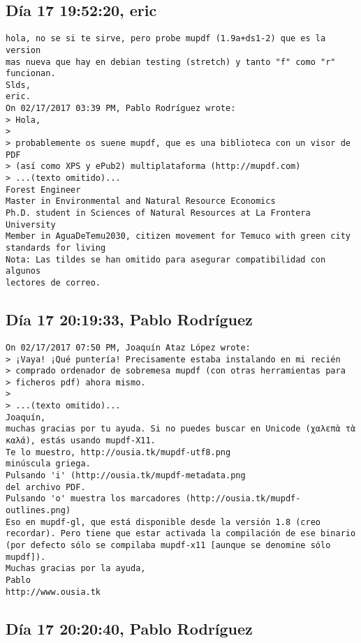 \documentclass[a4paper,10pt]{article}
\begin{document}
\subsection{Día 17 19:52:20, eric}

\begin{lstlisting}
hola, no se si te sirve, pero probe mupdf (1.9a+ds1-2) que es la version 
mas nueva que hay en debian testing (stretch) y tanto "f" como "r" 
funcionan.
Slds,
eric.
On 02/17/2017 03:39 PM, Pablo Rodríguez wrote:
> Hola,
>
> probablemente os suene mupdf, que es una biblioteca con un visor de PDF
> (así como XPS y ePub2) multiplataforma (http://mupdf.com)
> ...(texto omitido)...
Forest Engineer
Master in Environmental and Natural Resource Economics
Ph.D. student in Sciences of Natural Resources at La Frontera University
Member in AguaDeTemu2030, citizen movement for Temuco with green city 
standards for living
Nota: Las tildes se han omitido para asegurar compatibilidad con algunos 
lectores de correo.

\end{lstlisting}

\subsection{Día 17 20:19:33, Pablo Rodríguez}

\begin{lstlisting}
On 02/17/2017 07:50 PM, Joaquín Ataz López wrote:
> ¡Vaya! ¡Qué puntería! Precisamente estaba instalando en mi recién 
> comprado ordenador de sobremesa mupdf (con otras herramientas para 
> ficheros pdf) ahora mismo.
> 
> ...(texto omitido)...
Joaquín,
muchas gracias por tu ayuda. Si no puedes buscar en Unicode (χαλεπὰ τὰ
καλά), estás usando mupdf-X11.
Te lo muestro, http://ousia.tk/mupdf-utf8.png
minúscula griega.
Pulsando 'i' (http://ousia.tk/mupdf-metadata.png
del archivo PDF.
Pulsando 'o' muestra los marcadores (http://ousia.tk/mupdf-outlines.png)
Eso en mupdf-gl, que está disponible desde la versión 1.8 (creo
recordar). Pero tiene que estar activada la compilación de ese binario
(por defecto sólo se compilaba mupdf-x11 [aunque se denomine sólo mupdf]).
Muchas gracias por la ayuda,
Pablo
http://www.ousia.tk

\end{lstlisting}

\subsection{Día 17 20:20:40, Pablo Rodríguez}
\end{document}

